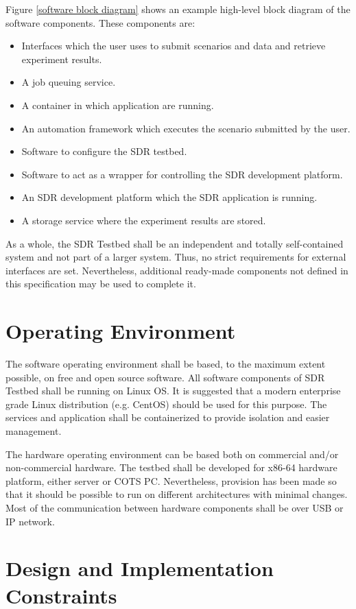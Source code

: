 \documentclass[english,titlepage,a4paper]{report}
\begin{document}
Figure \ref{software block diagram} shows an example high-level block diagram of the software components.
These components are:
\begin{itemize}
\item Interfaces which the user uses to submit scenarios and data and retrieve experiment results.
\item A job queuing service.
\item A container in which application are running.
\item An automation framework which executes the scenario submitted by the user.
\item Software to configure the SDR testbed.
\item Software to act as a wrapper for controlling the SDR development platform.
\item An SDR development platform which the SDR application is running.
\item A storage service where the experiment results are stored.
\end{itemize}

As a whole, the SDR Testbed shall be an independent and totally self-contained system and not part of a larger system.
Thus, no strict requirements for external interfaces are set.
Nevertheless, additional ready-made components not defined in this specification may be used to complete it.

\section{Operating Environment}

The software operating environment shall be based, to the maximum extent possible, on free and open source software.
All software components of SDR Testbed shall be running on Linux OS.
It is suggested that a modern enterprise grade Linux distribution (e.g. CentOS) should be used for this purpose.
The services and application shall be containerized to provide isolation and easier management.

The hardware operating environment can be based both on commercial and/or non-commercial hardware.
The testbed shall be developed for x86-64 hardware platform, either server or COTS PC.
Nevertheless, provision has been made so that it should be possible to run on different architectures with minimal changes.
Most of the communication between hardware components shall be over USB or IP network.

\section{Design and Implementation Constraints}
\end{document}
